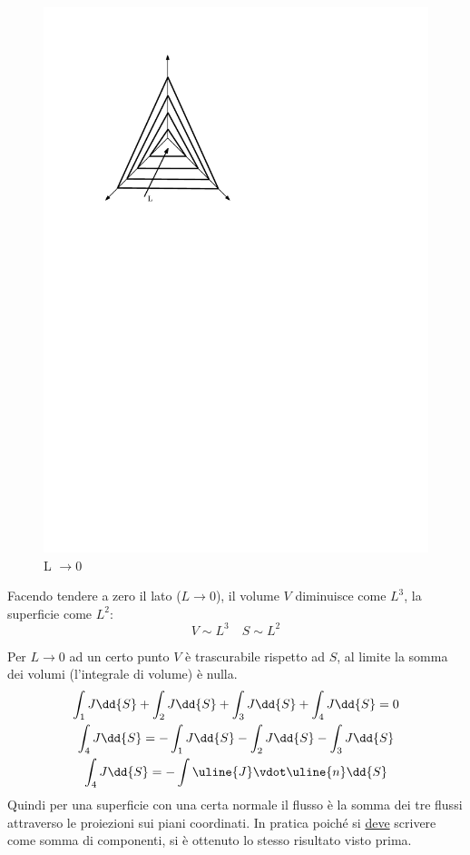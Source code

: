 %
	\begin{figure}[ht]
		\includegraphics[scale=0.8]{./1.4 Equazioni di bilancio/1.4-7}
		\centering
		\caption{L $\to 0$}
	\end{figure}
%
Facendo tendere a zero il lato ($L \to 0$), il volume $V$ diminuisce come $L^3$, la superficie come $L^2$:
%
	\begin{equation*}
		V \sim L^3 \quad S \sim L^2
	\end{equation*}
%

Per $L \to 0$ ad un certo punto $V$ è trascurabile rispetto ad $S$, al limite la somma dei volumi (l'integrale di volume) è nulla. 
%
	\begin{equation*}
		\begin{gathered} 
			\int_1 {J \dd{S}} + \int_2{J \dd{S}} + \int_3 {J \dd{S}} + \int_4 {J \dd{S}} = 0 \\
			\int_4 {J \dd{S}} = -\int_1 {J \dd{S}} - \int_2{J \dd{S}} - \int_3 {J \dd{S}} \\
			\int_4 {J \dd{S}} = - \int{\uline{J} \vdot \uline{n} \dd{S}}
		\end{gathered}
	\end{equation*}
%
Quindi per una superficie con una certa normale il flusso è la somma dei tre flussi attraverso le proiezioni sui piani coordinati. In pratica poiché si \uline{deve} scrivere come somma di componenti, si è ottenuto lo stesso risultato visto prima.
